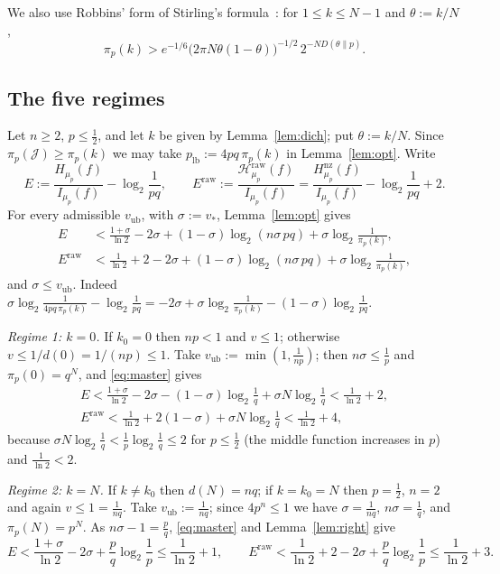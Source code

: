 \documentclass[11pt]{amsart}
\theoremstyle{remark}
\newcommand{\Hraw}{\mathcal{H}^{\mathrm{raw}}}
\newcommand{\J}{\mathcal{J}}
\begin{document}
We also use Robbins' form of Stirling's formula~\cite{Rob55}: for $1 \le k \le N - 1$ and $\theta := k/N$,
\begin{equation}\label{eq:robbins}
\pi_p(k) > e^{-1/6}\bigl(2\pi N\theta(1-\theta)\bigr)^{-1/2}\, 2^{-N D(\theta\|p)}.
\end{equation}

\subsection{The five regimes}\label{ssec:regimes}
Let $n \ge 2$, $p \le \frac12$, and let $k$ be given by Lemma~\ref{lem:dich}; put $\theta := k/N$. Since $\pi_p(\J) \ge \pi_p(k)$ we may take $p_{\mathrm{lb}} := 4pq\,\pi_p(k)$ in Lemma~\ref{lem:opt}. Write
\[
E := \frac{H_{\mu_p}(f)}{I_{\mu_p}(f)} - \log_2\frac{1}{pq}, \qquad E^{\mathrm{raw}} := \frac{\Hraw_{\mu_p}(f)}{I_{\mu_p}(f)} = \frac{H^{\mathrm{nz}}_{\mu_p}(f)}{I_{\mu_p}(f)} - \log_2\frac{1}{pq} + 2 .
\]
For every admissible $v_{\mathrm{ub}}$, with $\sigma := v_*$, Lemma~\ref{lem:opt} gives
\begin{equation}\label{eq:master}
\begin{split}
E &< \frac{1 + \sigma}{\ln 2} - 2\sigma + (1 - \sigma)\log_2(n\sigma\,pq) + \sigma\log_2\frac{1}{\pi_p(k)},\\
E^{\mathrm{raw}} &< \frac{1}{\ln 2} + 2 - 2\sigma + (1 - \sigma)\log_2(n\sigma\,pq) + \sigma\log_2\frac{1}{\pi_p(k)},
\end{split}
\end{equation}
and $\sigma \le v_{\mathrm{ub}}$. Indeed $\sigma\log_2\frac{1}{4pq\,\pi_p(k)} - \log_2\frac{1}{pq} = -2\sigma + \sigma\log_2\frac{1}{\pi_p(k)} - (1-\sigma)\log_2\frac{1}{pq}$.

\emph{Regime 1: $k = 0$.} If $k_0 = 0$ then $np < 1$ and $v \le 1$; otherwise $v \le 1/d(0) = 1/(np) \le 1$. Take $v_{\mathrm{ub}} := \min(1, \frac{1}{np})$; then $n\sigma \le \frac1p$ and $\pi_p(0) = q^N$, and \eqref{eq:master} gives
\[
\begin{gathered}
E < \frac{1 + \sigma}{\ln 2} - 2\sigma - (1-\sigma)\log_2\frac1q + \sigma N\log_2\frac1q < \frac{1}{\ln 2} + 2,\\
E^{\mathrm{raw}} < \frac{1}{\ln 2} + 2(1 - \sigma) + \sigma N\log_2\frac1q < \frac{1}{\ln 2} + 4,
\end{gathered}
\]
because $\sigma N\log_2\frac1q < \frac1p\log_2\frac1q \le 2$ for $p \le \frac12$ (the middle function increases in $p$) and $\frac{1}{\ln 2} < 2$.

\emph{Regime 2: $k = N$.} If $k \ne k_0$ then $d(N) = nq$; if $k = k_0 = N$ then $p = \frac12$, $n = 2$ and again $v \le 1 = \frac{1}{nq}$. Take $v_{\mathrm{ub}} := \frac{1}{nq}$; since $4p^n \le 1$ we have $\sigma = \frac{1}{nq}$, $n\sigma = \frac1q$, and $\pi_p(N) = p^N$. As $n\sigma - 1 = \frac pq$, \eqref{eq:master} and Lemma~\ref{lem:right} give
\[
E < \frac{1 + \sigma}{\ln 2} - 2\sigma + \frac pq\log_2\frac1p \le \frac{1}{\ln 2} + 1, \qquad E^{\mathrm{raw}} < \frac{1}{\ln 2} + 2 - 2\sigma + \frac pq\log_2\frac1p \le \frac{1}{\ln 2} + 3.
\]
\end{document}
